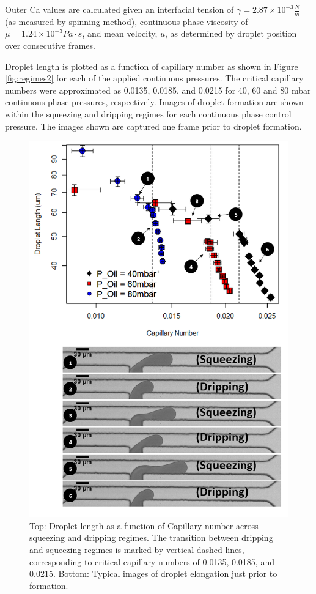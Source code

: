 Outer Ca values are calculated given an interfacial tension of $\gamma = 2.87 \times 10^{-3}\frac{N}{m}$ (as measured by spinning method), continuous phase viscosity of $\mu = 1.24 \times 10^{-3} Pa \cdot s$\cite{3M2009}, and mean velocity, $u$, as determined by droplet position over consecutive frames.

Droplet length is plotted as a function of capillary number as shown in Figure \vref{fig:regimes2} for each of the applied continuous pressures. The critical capillary numbers were approximated as 0.0135, 0.0185, and 0.0215 for 40, 60 and 80 mbar continuous phase pressures, respectively. Images of droplet formation are shown within the squeezing and dripping regimes for each continuous phase control pressure. The images shown are captured one frame prior to droplet formation. 

\begin{figure}[H]
\centering 
\includegraphics[width=0.75\columnwidth]{regimes2.PNG} 
\caption[Droplet length as a function of Capillary number across squeezing and dripping regimes]{Top: Droplet length as a function of Capillary number across squeezing and dripping regimes. The transition between dripping and squeezing regimes is marked by vertical dashed lines, corresponding to critical capillary numbers of 0.0135, 0.0185, and 0.0215. Bottom: Typical images of droplet elongation just prior to formation.} 
\label{fig:regimes2} 
\end{figure}

